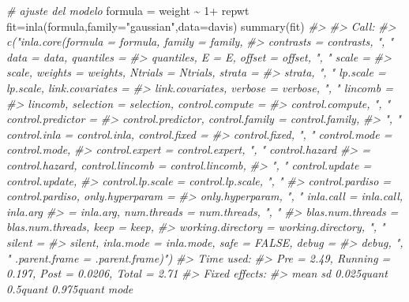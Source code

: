 \documentclass[
]{book}
\newenvironment{Shaded}{\begin{snugshade}}{\end{snugshade}}
\newcommand{\AttributeTok}[1]{\textcolor[rgb]{0.77,0.63,0.00}{#1}}
\newcommand{\CommentTok}[1]{\textcolor[rgb]{0.56,0.35,0.01}{\textit{#1}}}
\newcommand{\DecValTok}[1]{\textcolor[rgb]{0.00,0.00,0.81}{#1}}
\newcommand{\FunctionTok}[1]{\textcolor[rgb]{0.00,0.00,0.00}{#1}}
\newcommand{\NormalTok}[1]{#1}
\newcommand{\OtherTok}[1]{\textcolor[rgb]{0.56,0.35,0.01}{#1}}
\newcommand{\SpecialCharTok}[1]{\textcolor[rgb]{0.00,0.00,0.00}{#1}}
\newcommand{\StringTok}[1]{\textcolor[rgb]{0.31,0.60,0.02}{#1}}
\begin{document}
\begin{Shaded}
\begin{Highlighting}[]
\CommentTok{\# ajuste del modelo }
\NormalTok{formula }\OtherTok{=}\NormalTok{ weight }\SpecialCharTok{\textasciitilde{}} \DecValTok{1}\SpecialCharTok{+}\NormalTok{ repwt}
\NormalTok{fit}\OtherTok{=}\FunctionTok{inla}\NormalTok{(formula,}\AttributeTok{family=}\StringTok{"gaussian"}\NormalTok{,}\AttributeTok{data=}\NormalTok{davis)}
\FunctionTok{summary}\NormalTok{(fit)}
\CommentTok{\#\textgreater{} }
\CommentTok{\#\textgreater{} Call:}
\CommentTok{\#\textgreater{}    c("inla.core(formula = formula, family = family, }
\CommentTok{\#\textgreater{}    contrasts = contrasts, ", " data = data, quantiles = }
\CommentTok{\#\textgreater{}    quantiles, E = E, offset = offset, ", " scale = }
\CommentTok{\#\textgreater{}    scale, weights = weights, Ntrials = Ntrials, strata = }
\CommentTok{\#\textgreater{}    strata, ", " lp.scale = lp.scale, link.covariates = }
\CommentTok{\#\textgreater{}    link.covariates, verbose = verbose, ", " lincomb = }
\CommentTok{\#\textgreater{}    lincomb, selection = selection, control.compute = }
\CommentTok{\#\textgreater{}    control.compute, ", " control.predictor = }
\CommentTok{\#\textgreater{}    control.predictor, control.family = control.family, }
\CommentTok{\#\textgreater{}    ", " control.inla = control.inla, control.fixed = }
\CommentTok{\#\textgreater{}    control.fixed, ", " control.mode = control.mode, }
\CommentTok{\#\textgreater{}    control.expert = control.expert, ", " control.hazard }
\CommentTok{\#\textgreater{}    = control.hazard, control.lincomb = control.lincomb, }
\CommentTok{\#\textgreater{}    ", " control.update = control.update, }
\CommentTok{\#\textgreater{}    control.lp.scale = control.lp.scale, ", " }
\CommentTok{\#\textgreater{}    control.pardiso = control.pardiso, only.hyperparam = }
\CommentTok{\#\textgreater{}    only.hyperparam, ", " inla.call = inla.call, inla.arg }
\CommentTok{\#\textgreater{}    = inla.arg, num.threads = num.threads, ", " }
\CommentTok{\#\textgreater{}    blas.num.threads = blas.num.threads, keep = keep, }
\CommentTok{\#\textgreater{}    working.directory = working.directory, ", " silent = }
\CommentTok{\#\textgreater{}    silent, inla.mode = inla.mode, safe = FALSE, debug = }
\CommentTok{\#\textgreater{}    debug, ", " .parent.frame = .parent.frame)") }
\CommentTok{\#\textgreater{} Time used:}
\CommentTok{\#\textgreater{}     Pre = 2.49, Running = 0.197, Post = 0.0206, Total = 2.71 }
\CommentTok{\#\textgreater{} Fixed effects:}
\CommentTok{\#\textgreater{}              mean    sd 0.025quant 0.5quant 0.975quant mode}

\end{Highlighting}
\end{Shaded}
\end{document}
